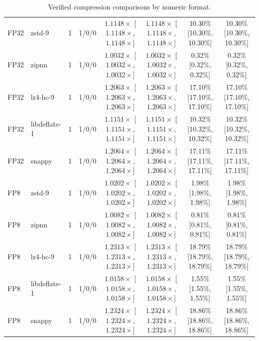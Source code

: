\begin{table}[t]
{\begin{tabular}{llrccccc}
FP32 & zstd-9 & 1 & 1/0/0 & $1.1148\times$ [$1.1148\times$, $1.1148\times$] & $1.1148\times$ [$1.1148\times$, $1.1148\times$] & 10.30\% [10.30\%, 10.30\%] & 10.30\% [10.30\%, 10.30\%] \\
FP32 & zipnn & 1 & 1/0/0 & $1.0032\times$ [$1.0032\times$, $1.0032\times$] & $1.0032\times$ [$1.0032\times$, $1.0032\times$] & 0.32\% [0.32\%, 0.32\%] & 0.32\% [0.32\%, 0.32\%] \\
FP32 & lz4-hc-9 & 1 & 1/0/0 & $1.2063\times$ [$1.2063\times$, $1.2063\times$] & $1.2063\times$ [$1.2063\times$, $1.2063\times$] & 17.10\% [17.10\%, 17.10\%] & 17.10\% [17.10\%, 17.10\%] \\
FP32 & libdeflate-1 & 1 & 1/0/0 & $1.1151\times$ [$1.1151\times$, $1.1151\times$] & $1.1151\times$ [$1.1151\times$, $1.1151\times$] & 10.32\% [10.32\%, 10.32\%] & 10.32\% [10.32\%, 10.32\%] \\
FP32 & snappy & 1 & 1/0/0 & $1.2064\times$ [$1.2064\times$, $1.2064\times$] & $1.2064\times$ [$1.2064\times$, $1.2064\times$] & 17.11\% [17.11\%, 17.11\%] & 17.11\% [17.11\%, 17.11\%] \\
FP8 & zstd-9 & 1 & 1/0/0 & $1.0202\times$ [$1.0202\times$, $1.0202\times$] & $1.0202\times$ [$1.0202\times$, $1.0202\times$] & 1.98\% [1.98\%, 1.98\%] & 1.98\% [1.98\%, 1.98\%] \\
FP8 & zipnn & 1 & 1/0/0 & $1.0082\times$ [$1.0082\times$, $1.0082\times$] & $1.0082\times$ [$1.0082\times$, $1.0082\times$] & 0.81\% [0.81\%, 0.81\%] & 0.81\% [0.81\%, 0.81\%] \\
FP8 & lz4-hc-9 & 1 & 1/0/0 & $1.2313\times$ [$1.2313\times$, $1.2313\times$] & $1.2313\times$ [$1.2313\times$, $1.2313\times$] & 18.79\% [18.79\%, 18.79\%] & 18.79\% [18.79\%, 18.79\%] \\
FP8 & libdeflate-1 & 1 & 1/0/0 & $1.0158\times$ [$1.0158\times$, $1.0158\times$] & $1.0158\times$ [$1.0158\times$, $1.0158\times$] & 1.55\% [1.55\%, 1.55\%] & 1.55\% [1.55\%, 1.55\%] \\
FP8 & snappy & 1 & 1/0/0 & $1.2324\times$ [$1.2324\times$, $1.2324\times$] & $1.2324\times$ [$1.2324\times$, $1.2324\times$] & 18.86\% [18.86\%, 18.86\%] & 18.86\% [18.86\%, 18.86\%] \\
\hline
\end{tabular}
}
\caption{Verified compression comparisons by numeric format.}
\label{tab:verified-compression-format}
\end{table}
